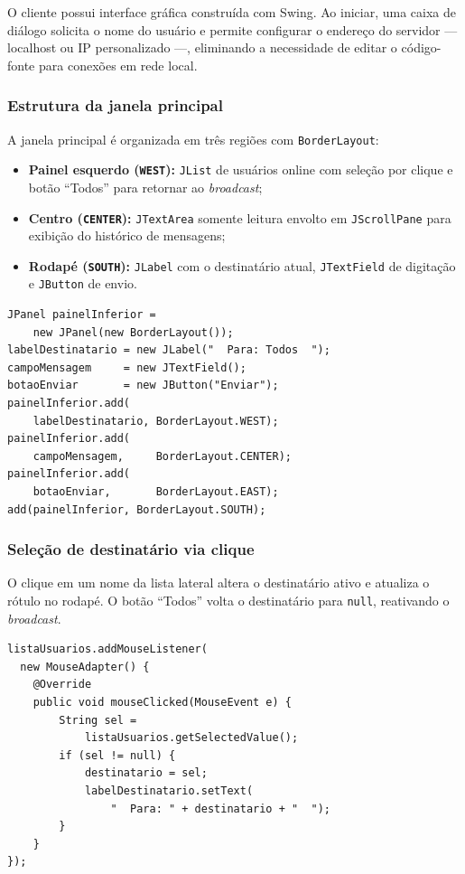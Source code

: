 \documentclass[10pt,twocolumn,a4paper]{article}
\begin{document}
O cliente possui interface gráfica construída com Swing. Ao iniciar, uma caixa
de diálogo solicita o nome do usuário e permite configurar o endereço do
servidor — localhost ou IP personalizado —, eliminando a necessidade de editar
o código-fonte para conexões em rede local.

\subsubsection{Estrutura da janela principal}

A janela principal é organizada em três regiões com \texttt{BorderLayout}:

\begin{itemize}
    \item \textbf{Painel esquerdo (\texttt{WEST}):} \texttt{JList} de usuários
          online com seleção por clique e botão ``Todos'' para retornar ao
          \textit{broadcast};
    \item \textbf{Centro (\texttt{CENTER}):} \texttt{JTextArea} somente leitura
          envolto em \texttt{JScrollPane} para exibição do histórico de
          mensagens;
    \item \textbf{Rodapé (\texttt{SOUTH}):} \texttt{JLabel} com o destinatário
          atual, \texttt{JTextField} de digitação e \texttt{JButton} de envio.
\end{itemize}

\begin{lstlisting}[caption={Montagem do painel inferior (rodapé)}]
JPanel painelInferior =
    new JPanel(new BorderLayout());
labelDestinatario = new JLabel("  Para: Todos  ");
campoMensagem     = new JTextField();
botaoEnviar       = new JButton("Enviar");
painelInferior.add(
    labelDestinatario, BorderLayout.WEST);
painelInferior.add(
    campoMensagem,     BorderLayout.CENTER);
painelInferior.add(
    botaoEnviar,       BorderLayout.EAST);
add(painelInferior, BorderLayout.SOUTH);
\end{lstlisting}

\subsubsection{Seleção de destinatário via clique}

O clique em um nome da lista lateral altera o destinatário ativo e atualiza
o rótulo no rodapé. O botão ``Todos'' volta o destinatário para
\texttt{null}, reativando o \textit{broadcast}.

\begin{lstlisting}[caption={Listener da lista de usuários}]
listaUsuarios.addMouseListener(
  new MouseAdapter() {
    @Override
    public void mouseClicked(MouseEvent e) {
        String sel =
            listaUsuarios.getSelectedValue();
        if (sel != null) {
            destinatario = sel;
            labelDestinatario.setText(
                "  Para: " + destinatario + "  ");
        }
    }
});
\end{lstlisting}
\end{document}
